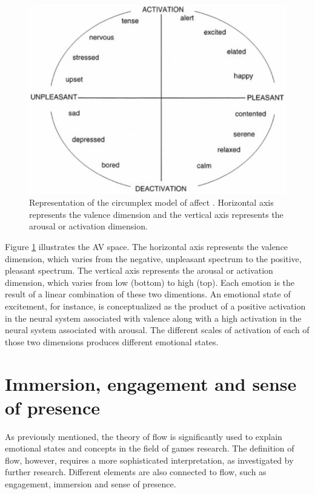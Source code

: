 \begin{figure}[h!]
    \centering
    \includegraphics[scale=0.5]{figures/russell-av.png}
    \caption{Representation of the circumplex model of affect \parencite{posner2005circumplex}. Horizontal axis represents the valence dimension and the vertical axis represents the arousal or activation dimension.}
    \label{fig:av-model}
\end{figure}

Figure \ref{fig:av-model} illustrates the AV space. The horizontal axis represents the valence dimension, which varies from the negative, unpleasant spectrum to the positive, pleasant spectrum. The vertical axis represents the arousal or activation dimension, which varies from low (bottom) to high (top). Each emotion is the result of a linear combination of these two dimentions. An emotional state of excitement, for instance, is conceptualized as the product of a positive activation in the neural system associated with valence along with a high activation in the neural system associated with arousal. The different scales of activation of each of those two dimensions produces different emotional states.

\section{Immersion, engagement and sense of presence}

As previously mentioned, the theory of flow is significantly used to explain emotional states and concepts in the field of games research. The definition of flow, however, requires a more sophisticated interpretation, as investigated by further research. %
Different elements are also connected to flow, such as engagement, immersion and sense of presence.

